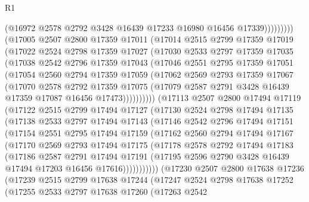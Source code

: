 \begin{lexlean}{R1}
\begin{coremodule}
                    (@16972 @2578 @2792 @3428 @16439 @17233 @16980 @16456 @17339)))))))))
    (@17005
      @2507
      @2800
      @17359
      @17011
      (@17014
        @2515
        @2799
        @17359
        @17019
        (@17022
          @2524
          @2798
          @17359
          @17027
          (@17030
            @2533
            @2797
            @17359
            @17035
            (@17038
              @2542
              @2796
              @17359
              @17043
              (@17046
                @2551
                @2795
                @17359
                @17051
                (@17054
                  @2560
                  @2794
                  @17359
                  @17059
                  (@17062
                    @2569
                    @2793
                    @17359
                    @17067
                    (@17070
                      @2578
                      @2792
                      @17359
                      @17075
                      (@17079 @2587 @2791 @3428 @16439 @17359 @17087 @16456 @17473))))))))))
    (@17113
      @2507
      @2800
      @17494
      @17119
      (@17122
        @2515
        @2799
        @17494
        @17127
        (@17130
          @2524
          @2798
          @17494
          @17135
          (@17138
            @2533
            @2797
            @17494
            @17143
            (@17146
              @2542
              @2796
              @17494
              @17151
              (@17154
                @2551
                @2795
                @17494
                @17159
                (@17162
                  @2560
                  @2794
                  @17494
                  @17167
                  (@17170
                    @2569
                    @2793
                    @17494
                    @17175
                    (@17178
                      @2578
                      @2792
                      @17494
                      @17183
                      (@17186
                        @2587
                        @2791
                        @17494
                        @17191
                        (@17195 @2596 @2790 @3428 @16439 @17494 @17203 @16456 @17616)))))))))))
    (@17230
      @2507
      @2800
      @17638
      @17236
      (@17239
        @2515
        @2799
        @17638
        @17244
        (@17247
          @2524
          @2798
          @17638
          @17252
          (@17255
            @2533
            @2797
            @17638
            @17260
            (@17263
              @2542

\end{coremodule}
\end{lexlean}
